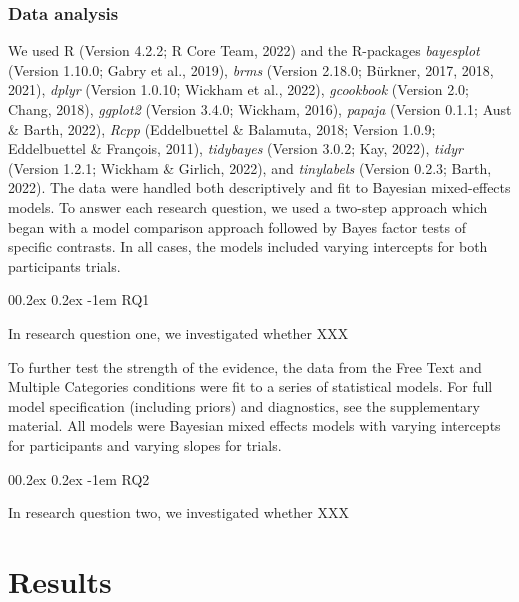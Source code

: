 \documentclass[
  man]{apa7}
\makeatletter
\let\oldparagraph\paragraph
\renewcommand{\paragraph}[1]{\oldparagraph{#1}\mbox{}}
\renewcommand{\paragraph}{\@startsection{paragraph}{4}{\parindent}%
  {0\baselineskip \@plus 0.2ex \@minus 0.2ex}%
  {-1em}%
  {\normalfont\normalsize\bfseries\itshape\typesectitle}}
\renewcommand{\paragraph}{\@startsection{paragraph}{4}{\parindent}%
  {0\baselineskip \@plus 0.2ex \@minus 0.2ex}%
  {-1em}%
  {\normalfont\normalsize\bfseries\typesectitle}}
\makeatother
\begin{document}
\hypertarget{data-analysis}{%
\subsubsection{Data analysis}\label{data-analysis}}

We used R (Version 4.2.2; R Core Team, 2022) and the R-packages \emph{bayesplot} (Version 1.10.0; Gabry et al., 2019), \emph{brms} (Version 2.18.0; Bürkner, 2017, 2018, 2021), \emph{dplyr} (Version 1.0.10; Wickham et al., 2022), \emph{gcookbook} (Version 2.0; Chang, 2018), \emph{ggplot2} (Version 3.4.0; Wickham, 2016), \emph{papaja} (Version 0.1.1; Aust \& Barth, 2022), \emph{Rcpp} (Eddelbuettel \& Balamuta, 2018; Version 1.0.9; Eddelbuettel \& François, 2011), \emph{tidybayes} (Version 3.0.2; Kay, 2022), \emph{tidyr} (Version 1.2.1; Wickham \& Girlich, 2022), and \emph{tinylabels} (Version 0.2.3; Barth, 2022). The data were handled both descriptively and fit to Bayesian mixed-effects models. To answer each research question, we used a two-step approach which began with a model comparison approach followed by Bayes factor tests of specific contrasts. In all cases, the models included varying intercepts for both participants trials.

\hypertarget{rq1}{%
\paragraph{RQ1}\label{rq1}}

In research question one, we investigated whether XXX

To further test the strength of the evidence, the data from the Free Text and Multiple Categories conditions were fit to a series of statistical models. For full model specification (including priors) and diagnostics, see the supplementary material. All models were Bayesian mixed effects models with varying intercepts for participants and varying slopes for trials.

\hypertarget{rq2}{%
\paragraph{RQ2}\label{rq2}}

In research question two, we investigated whether XXX

\hypertarget{results}{%
\section{Results}\label{results}}
\end{document}
